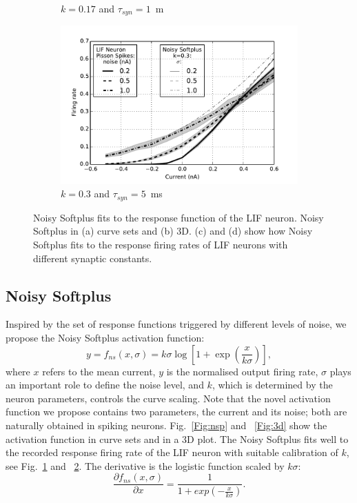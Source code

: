 \begin{figure}[htb!]
\begin{subfigure}[t]{0.45\textwidth}
		    \caption{$k=0.17$ and $\tau_{syn}=1$~m}
		    \label{Fig:nsptau1}
		\end{subfigure}
		\begin{subfigure}[t]{0.45\textwidth}
			\includegraphics[width=\textwidth]{pics_iconip/4-2.pdf}
		    \caption{$k=0.3$ and $\tau_{syn}=5$~ms}
		    \label{Fig:scale}
		\end{subfigure}

		\caption{
			Noisy Softplus fits to the response function of the LIF neuron.
			Noisy Softplus in (a) curve sets and (b) 3D.
			(c) and (d) show how Noisy Softplus fits to the response firing rates of LIF neurons with different synaptic constants.}
		\label{fig:nsp}
	\end{figure}
	
	\subsection{Noisy Softplus}
	Inspired by the set of response functions triggered by different levels of noise, we propose the Noisy Softplus activation function:
	\begin{equation}
	y = f_{ns}(x, \sigma) = k \sigma \log [1 + \exp(\frac{x}{k \sigma})],
	\label{equ:nsp}
	\end{equation}
	where $x$ refers to the mean current, $y$ is the normalised output firing rate, $\sigma$ plays an important role to define the noise level, and $k$, which is determined by the neuron parameters, controls the curve scaling.
	Note that the novel activation function we propose contains two parameters, the current and its noise; both are naturally obtained in spiking neurons.
	Fig.~\ref{Fig:nsp} and ~\ref{Fig:3d} show the activation function in curve sets and in a 3D plot.
	The Noisy Softplus fits well to the recorded response firing rate of the LIF neuron with suitable calibration of $k$, see Fig.~\ref{Fig:nsptau1} and ~\ref{Fig:scale}.
	The derivative is the logistic function scaled by $k\sigma$:
	\begin{equation}
	\frac{\partial f_{ns}(x,\sigma)}{\partial x} = \frac{1}{1+exp(-\frac{x}{k\sigma})}.
	\label{equ:logist}
	\end{equation}	
	
